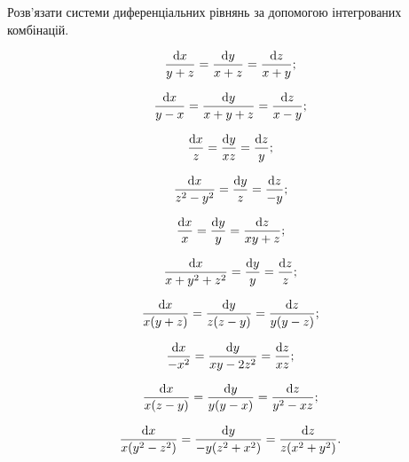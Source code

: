 Розв’язати системи диференціальних рівнянь за допомогою інтегрованих комбінацій.

\begin{multicols}{2}
\begin{problem}
	\[ \frac{\mathop{}\!\mathrm{d} x}{y + z} = \frac{\mathop{}\!\mathrm{d} y}{x + z} = \frac{\mathop{}\!\mathrm{d} z}{x + y}; \]
\end{problem}
\begin{problem}
	\[ \frac{\mathop{}\!\mathrm{d} x}{y - x} = \frac{\mathop{}\!\mathrm{d} y}{x + y + z} = \frac{\mathop{}\!\mathrm{d} z}{x - y}; \]
\end{problem}
\begin{problem}
	\[ \frac{\mathop{}\!\mathrm{d} x}{z} = \frac{\mathop{}\!\mathrm{d} y}{x z} = \frac{\mathop{}\!\mathrm{d} z}{y}; \]
\end{problem}
\begin{problem}
	\[ \frac{\mathop{}\!\mathrm{d} x}{z^2 - y^2} = \frac{\mathop{}\!\mathrm{d} y}{z} = \frac{\mathop{}\!\mathrm{d} z}{- y}; \]
\end{problem}
\begin{problem}
	\[ \frac{\mathop{}\!\mathrm{d} x}{x} = \frac{\mathop{}\!\mathrm{d} y}{y} = \frac{\mathop{}\!\mathrm{d} z}{x y + z}; \]
\end{problem}
\begin{problem}
	\[ \frac{\mathop{}\!\mathrm{d} x}{x + y^2 + z^2} = \frac{\mathop{}\!\mathrm{d} y}{y} = \frac{\mathop{}\!\mathrm{d} z}{z}; \]
\end{problem}
\begin{problem}
	\[ \frac{\mathop{}\!\mathrm{d} x}{x (y + z)} = \frac{\mathop{}\!\mathrm{d} y}{z (z - y)} = \frac{\mathop{}\!\mathrm{d} z}{y  (y - z)}; \]
\end{problem}
\begin{problem}
	\[ \frac{\mathop{}\!\mathrm{d} x}{-x^2} = \frac{\mathop{}\!\mathrm{d} y}{x y - 2 z^2} = \frac{\mathop{}\!\mathrm{d} z}{x z}; \]
\end{problem}
\begin{problem}
	\[ \frac{\mathop{}\!\mathrm{d} x}{x (z - y)} = \frac{\mathop{}\!\mathrm{d} y}{y (y - x)} = \frac{\mathop{}\!\mathrm{d} z}{y^2 - x z}; \]
\end{problem}
\begin{problem}
	\[ \frac{\mathop{}\!\mathrm{d} x}{x (y^2 - z^2)} = \frac{\mathop{}\!\mathrm{d} y}{- y (z^2 + x^2)} = \frac{\mathop{}\!\mathrm{d} z}{z (x^2 + y^2)}. \]
\end{problem}
\end{multicols}
